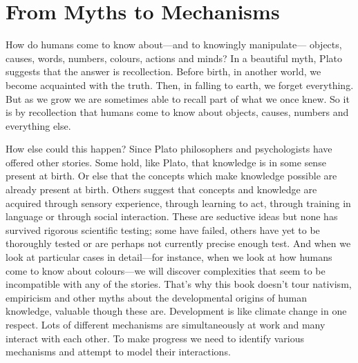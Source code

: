 \documentclass[12pt,\papersize]{extarticle}
\date{}
\begin{document}
\setlength\footnotesep{1em}




\maketitle



\section{From Myths to Mechanisms}

How do humans come to know  about---and to knowingly manipulate---%
objects,
causes,
words,
numbers,
colours,
actions
and
minds?
In a beautiful myth, Plato suggests that the answer is recollection. 
Before birth, in another world, we become acquainted with the truth. 
Then, in falling to earth, we forget everything. 
But as we grow we are sometimes able to recall part of what we once knew.
So it is by recollection that humans come to know about objects, causes, numbers and everything else. 

How else could this happen?
Since Plato philosophers and psychologists have offered other stories.  
Some hold, like Plato, that knowledge is in some sense present at birth.
Or else that the concepts which make knowledge possible are already present at birth. 
Others suggest that concepts and knowledge are acquired through sensory experience, through learning to act, through training in language or through social interaction.
These are seductive ideas but none has survived rigorous scientific testing; some have failed, others have yet to be  thoroughly tested or are perhaps not  currently precise enough test. 
And when we look at particular cases in detail---for instance, when we look at how humans come to know about colours---we will discover complexities that seem to be incompatible with any of the stories. 
That's why this book doesn't tour nativism, empiricism and other myths about the developmental origins of human knowledge, valuable though these are. 
Development is like climate change in one respect.
Lots of different mechanisms are simultaneously at work and many interact with each other. 
To make progress we need to identify various mechanisms and attempt to model their interactions. 
\end{document}
